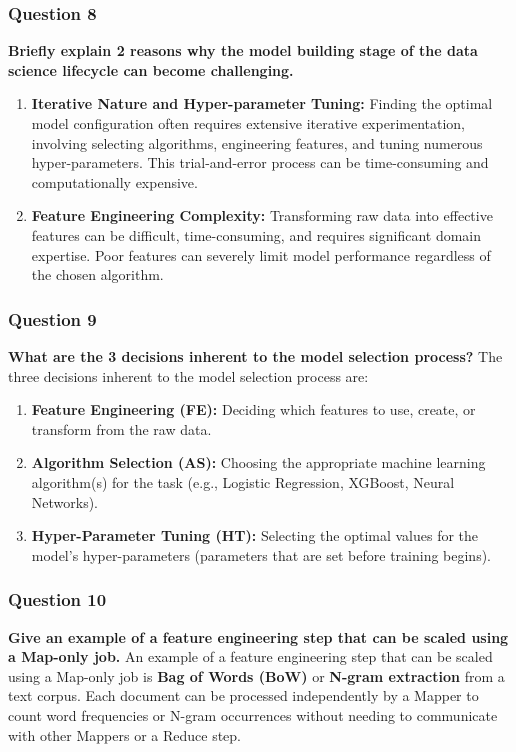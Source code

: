 \documentclass{article}
\begin{document}
\subsubsection*{Question 8}
\textbf{Briefly explain 2 reasons why the model building stage of the data science lifecycle can become challenging.}
    \begin{enumerate}[label=\alph*)]
        \item \textbf{Iterative Nature and Hyper-parameter Tuning:} Finding the optimal model configuration often requires extensive iterative experimentation, involving selecting algorithms, engineering features, and tuning numerous hyper-parameters. This trial-and-error process can be time-consuming and computationally expensive.
        \item \textbf{Feature Engineering Complexity:} Transforming raw data into effective features can be difficult, time-consuming, and requires significant domain expertise. Poor features can severely limit model performance regardless of the chosen algorithm.
    \end{enumerate}

\subsubsection*{Question 9}
\textbf{What are the 3 decisions inherent to the model selection process?}
    The three decisions inherent to the model selection process are:
    \begin{enumerate}[label=\alph*)]
        \item \textbf{Feature Engineering (FE):} Deciding which features to use, create, or transform from the raw data.
        \item \textbf{Algorithm Selection (AS):} Choosing the appropriate machine learning algorithm(s) for the task (e.g., Logistic Regression, XGBoost, Neural Networks).
        \item \textbf{Hyper-Parameter Tuning (HT):} Selecting the optimal values for the model's hyper-parameters (parameters that are set before training begins).
    \end{enumerate}

\subsubsection*{Question 10}
\textbf{Give an example of a feature engineering step that can be scaled using a Map-only job.}
    An example of a feature engineering step that can be scaled using a Map-only job is \textbf{Bag of Words (BoW)} or \textbf{N-gram extraction} from a text corpus. Each document can be processed independently by a Mapper to count word frequencies or N-gram occurrences without needing to communicate with other Mappers or a Reduce step.
\end{document}
